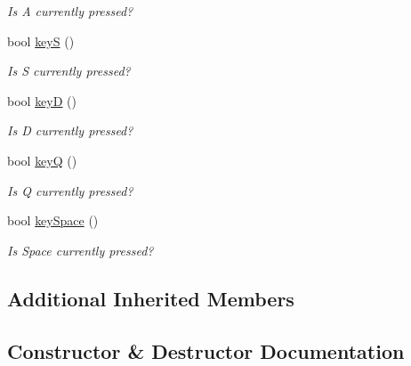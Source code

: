 \begin{DoxyCompactItemize}
\begin{DoxyCompactList}\small\item\em Is A currently pressed? \end{DoxyCompactList}\item 
bool \mbox{\hyperlink{classbridges_1_1game_1_1_non_blocking_game_a75ece5d4fa35893ecacc82c5064c05e0}{keyS}} ()
\begin{DoxyCompactList}\small\item\em Is S currently pressed? \end{DoxyCompactList}\item 
bool \mbox{\hyperlink{classbridges_1_1game_1_1_non_blocking_game_a932979445cc8acea618092b83b4a9756}{keyD}} ()
\begin{DoxyCompactList}\small\item\em Is D currently pressed? \end{DoxyCompactList}\item 
bool \mbox{\hyperlink{classbridges_1_1game_1_1_non_blocking_game_af0dafefbad315fbfb01851a4a0dfa93e}{keyQ}} ()
\begin{DoxyCompactList}\small\item\em Is Q currently pressed? \end{DoxyCompactList}\item 
bool \mbox{\hyperlink{classbridges_1_1game_1_1_non_blocking_game_a54beca154b58b0e0fb26c75983ba5072}{key\+Space}} ()
\begin{DoxyCompactList}\small\item\em Is Space currently pressed? \end{DoxyCompactList}\end{DoxyCompactItemize}
\subsection*{Additional Inherited Members}


\subsection{Constructor \& Destructor Documentation}
\mbox{\label{classbridges_1_1game_1_1_non_blocking_game_a3226aa7e7ff129e916f4bd5aabcb2e72}} 
